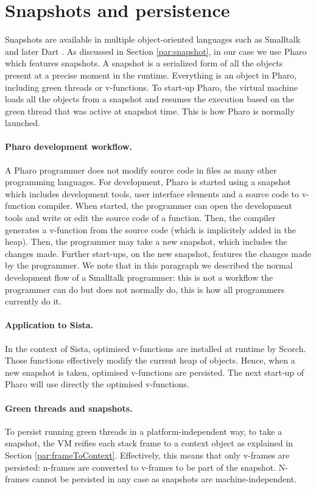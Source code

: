 \documentclass[a4paper,12pt,twoside]{../includes/ThesisStyle}
\begin{document}
\section{Snapshots and persistence}
\label{sec:snaphotpersist}

Snapshots are available in multiple object-oriented languages such as Smalltalk \cite{Gold83a} and later Dart \cite{Anna13a}. As discussed in Section \ref{par:snapshot}, in our case we use Pharo which features snapshots. A snapshot is a serialized form of all the objects present at a precise moment in the runtime. Everything is an object in Pharo, including green threads or v-functions. To start-up Pharo, the virtual machine loads all the objects from a snapshot and resumes the execution based on the green thread that was active at snapshot time. This is how Pharo is normally launched.

\paragraph{Pharo development workflow.}A Pharo programmer does not modify source code in files as many other programming languages. For development, Pharo is started using a snapshot which includes development tools, user interface elements and a source code to v-function compiler. When started, the programmer can open the development tools and write or edit the source code of a function. Then, the compiler generates a v-function from the source code (which is implicitely added in the heap). Then, the programmer may take a new snapshot, which includes the changes made. Further start-ups, on the new snapshot, features the changes made by the programmer. We note that in this paragraph we described the normal development flow of a Smalltalk programmer: this is not a workflow the programmer can do but does not normally do, this is how all programmers currently do it.

\paragraph{Application to Sista.}In the context of Sista, optimised v-functions are installed at runtime by Scorch. Those functions effectively modify the current heap of objects. Hence, when a new snapshot is taken, optimised v-functions are persisted. The next start-up of Pharo will use directly the optimised v-functions.

\paragraph{Green threads and snapshots.}To persist running green threads in a platform-independent way, to take a snapshot, the VM reifies each stack frame to a context object as explained in Section \ref{par:frameToContext}. Effectively, this means that only v-frames are persisted: n-frames are converted to v-frames to be part of the snapshot. N-frames cannot be persisted in any case as snapshots are machine-independent.
\end{document}
